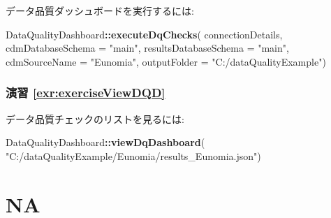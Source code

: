 \documentclass[
  11pt]{book}
\newenvironment{Shaded}{\begin{snugshade}}{\end{snugshade}}
\newcommand{\AttributeTok}[1]{\textcolor[rgb]{0.13,0.29,0.53}{#1}}
\newcommand{\FunctionTok}[1]{\textcolor[rgb]{0.13,0.29,0.53}{\textbf{#1}}}
\newcommand{\NormalTok}[1]{#1}
\newcommand{\SpecialCharTok}[1]{\textcolor[rgb]{0.81,0.36,0.00}{\textbf{#1}}}
\newcommand{\StringTok}[1]{\textcolor[rgb]{0.31,0.60,0.02}{#1}}
\theoremstyle{definition}
\theoremstyle{definition}
\theoremstyle{definition}
\theoremstyle{definition}
\theoremstyle{remark}
\begin{document}
データ品質ダッシュボードを実行するには:

\begin{Shaded}
\begin{Highlighting}[]
\NormalTok{DataQualityDashboard}\SpecialCharTok{::}\FunctionTok{executeDqChecks}\NormalTok{(}
\NormalTok{  connectionDetails,}
  \AttributeTok{cdmDatabaseSchema =} \StringTok{"main"}\NormalTok{,}
  \AttributeTok{resultsDatabaseSchema =} \StringTok{"main"}\NormalTok{,}
  \AttributeTok{cdmSourceName =} \StringTok{"Eunomia"}\NormalTok{,}
  \AttributeTok{outputFolder =} \StringTok{"C:/dataQualityExample"}\NormalTok{)}
\end{Highlighting}
\end{Shaded}

\subsubsection*{演習 \ref{exr:exerciseViewDQD}}\label{ux6f14ux7fd2-refexrexerciseviewdqd}

データ品質チェックのリストを見るには:

\begin{Shaded}
\begin{Highlighting}[]
\NormalTok{DataQualityDashboard}\SpecialCharTok{::}\FunctionTok{viewDqDashboard}\NormalTok{(}
  \StringTok{"C:/dataQualityExample/Eunomia/results\_Eunomia.json"}\NormalTok{)}
\end{Highlighting}
\end{Shaded}

\section{}\label{section}

\section{NA}\label{na-1}

  

\backmatter
\printindex
\end{document}
